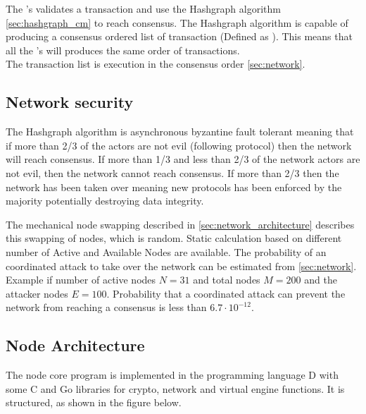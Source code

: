 The 's validates a transaction and use the Hashgraph algorithm \cref{sec:hashgraph_cm} to reach consensus. The Hashgraph algorithm is capable of producing a consensus ordered list of transaction (Defined as ). This means that all the 's will produces the same order of transactions.\\
The transaction list is execution in the consensus order \cref{sec:network}.

\subsection{Network security}

The Hashgraph algorithm is asynchronous byzantine fault tolerant meaning that if more than 2/3 of the actors are not evil (following protocol) then the network will reach consensus. If more than 1/3 and less than 2/3 of the network actors are not evil, then the network cannot reach consensus. If more than 2/3 then the network has been taken over meaning new protocols has been enforced by the majority potentially destroying data integrity. 

The mechanical node swapping described in \cref{sec:network_architecture} describes this swapping of nodes, which is  random. Static calculation based on different number of Active and Available Nodes are available.
The probability of an coordinated attack to take over the network can be estimated from \cref{sec:network}.\\

Example if number of active nodes $N=31$ and total nodes $M=200$ and the attacker nodes $E=100$.
Probability that a coordinated attack can prevent the network from reaching a consensus is less than $6.7 \cdot 10^{-12}$.

\subsection{Node Architecture}
The node core program is implemented in the programming language D with some C and Go libraries for crypto, network and virtual engine functions. It is structured, as shown in the figure below. 

